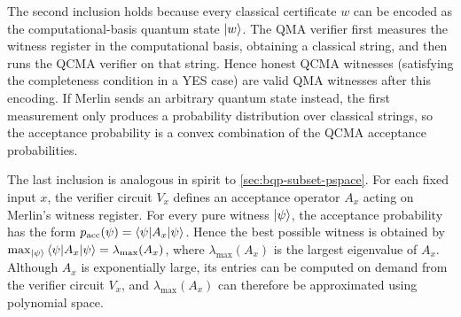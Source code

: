 
The second inclusion holds because every classical certificate \(w\) can be encoded as the computational-basis quantum state \(\ket w\). 
The QMA verifier first measures the witness register in the computational basis, obtaining a classical string, and then runs the QCMA verifier on that string. 
Hence honest QCMA witnesses (satisfying the completeness condition in a YES case) are valid QMA witnesses after this encoding. 
If Merlin sends an arbitrary quantum state instead, the first measurement only produces a probability distribution over classical strings, so the acceptance probability is a convex combination of the QCMA acceptance probabilities.


The last inclusion is %
analogous in spirit to \autoref{sec:bqp-subset-pspace}.
For each fixed input \(x\), the verifier circuit \(V_x\) defines an acceptance operator \(A_x\) acting on Merlin's witness register.
For every pure witness \(\ket\psi\), the acceptance probability has the form
\(
p_{\mathrm{acc}}(\psi) \allowbreak
= \allowbreak
\braket{\psi | A_x | \psi}
\).
Hence the best possible witness is obtained by 
\(
\max_{\ket\psi}\braket{\psi | A_x | \psi}
=
\lambda_{\max}(A_x)
\),
where \(\lambda_{\max}(A_x)\) is the largest eigenvalue of \(A_x\).
Although \(A_x\) is exponentially large, its entries can be computed on demand from the verifier circuit \(V_x\), and \(\lambda_{\max}(A_x)\) can therefore be approximated using polynomial space.

